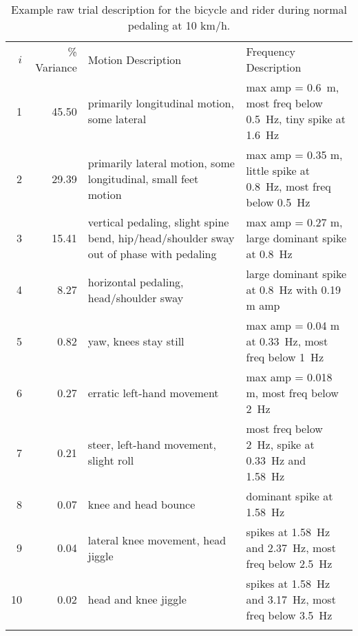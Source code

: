 \documentclass[smallextended]{svjour3}     %
\begin{document}
\begin{table}
    \caption{Example raw trial description for the bicycle and rider during normal pedaling at 10 km/h.}
    \label{tab:trialDesc}
    \centering
    {\small
	\begin{tabular}{rrp{40mm}p{40mm}}
	\hline\noalign{\smallskip}
        $i$ & \% Variance & Motion Description & Frequency Description\\
        \noalign{\smallskip}\hline\noalign{\smallskip}
        1  & 45.50 & primarily longitudinal motion, some lateral & max amp = 0.6~m, most freq below 0.5~Hz, tiny spike at 1.6~Hz\\
        2  & 29.39 & primarily lateral motion, some longitudinal, small feet motion & max amp = 0.35 m, little spike at 0.8~Hz, most freq below 0.5~Hz\\
        3  & 15.41 & vertical pedaling, slight spine bend, hip/head/shoulder
            sway out of phase with pedaling & max amp = 0.27 m, large dominant spike at 0.8~Hz\\
        4  & 8.27  & horizontal pedaling, head/shoulder sway & large dominant spike at 0.8~Hz with 0.19 m amp\\
        5  & 0.82  & yaw, knees stay still & max amp = 0.04 m at 0.33~Hz, most freq below 1~Hz\\
        6  & 0.27  & erratic left-hand movement & max amp = 0.018 m, most freq below 2~Hz\\
        7  & 0.21  & steer, left-hand movement, slight roll & most freq below 2~Hz, spike at 0.33~Hz and 1.58~Hz\\
        8  & 0.07  & knee and head bounce & dominant spike at 1.58~Hz\\
        9  & 0.04  & lateral knee movement, head jiggle & spikes at 1.58~Hz and 2.37~Hz, most freq below 2.5~Hz\\
        10 & 0.02  & head and knee jiggle & spikes at 1.58~Hz and 3.17~Hz, most freq below 3.5~Hz\\
	\noalign{\smallskip}\hline
        \end{tabular}
    }

\end{table}
\end{document}
